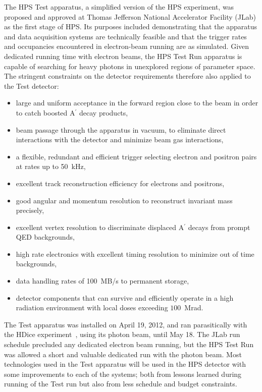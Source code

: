 \documentclass[final,3p,times,twocolumn]{elsarticle}
\newcommand{\Aprime}{A\ensuremath{^\prime}}
\begin{document}
The HPS Test apparatus, a simplified version of the HPS experiment, was proposed and 
approved at Thomas Jefferson National Accelerator Facility (JLab) as the first stage of HPS. 
Its purposes included demonstrating that the apparatus and data acquisition systems are 
technically feasible and that the trigger rates and occupancies encountered in electron-beam 
running are as simulated. Given dedicated running time with electron beams, the HPS Test Run 
apparatus is capable of searching for heavy photons in unexplored regions of parameter space.    
The stringent constraints on the detector requirements therefore also applied to the Test detector:
\begin{itemize}
\item large and uniform acceptance in the forward region close to the beam in order to catch boosted 
\Aprime{} decay products,
\item beam passage through the apparatus in vacuum, to eliminate direct interactions with the 
detector and minimize beam gas interactions, 
\item a flexible, redundant and efficient trigger selecting electron and positron pairs at rates up to 
50~kHz,
\item excellent track reconstruction efficiency for electrons and positrons,
\item good angular and momentum resolution to reconstruct invariant mass precisely,
\item excellent vertex resolution to discriminate displaced \Aprime{} decays from prompt QED 
backgrounds,
\item high rate electronics with excellent timing resolution to minimize out of time backgrounds,
\item data handling rates of 100~MB/s to permanent storage,
\item detector components that can survive and efficiently operate in a high radiation environment 
with local doses exceeding $100$~Mrad.
\end{itemize}


The Test apparatus was installed on April 19, 2012, and ran parasitically with the HDice 
experiment~\cite{HDice}, using its photon beam, until May 18. The JLab run schedule 
precluded any dedicated electron beam running, but the HPS Test Run was allowed a short and 
valuable dedicated run with the photon beam. Most technologies used in the Test apparatus will 
be used in the HPS detector with some improvements to each of the systems; both from lessons 
learned during running of the Test run but also from less schedule and budget constraints. 
\end{document}
